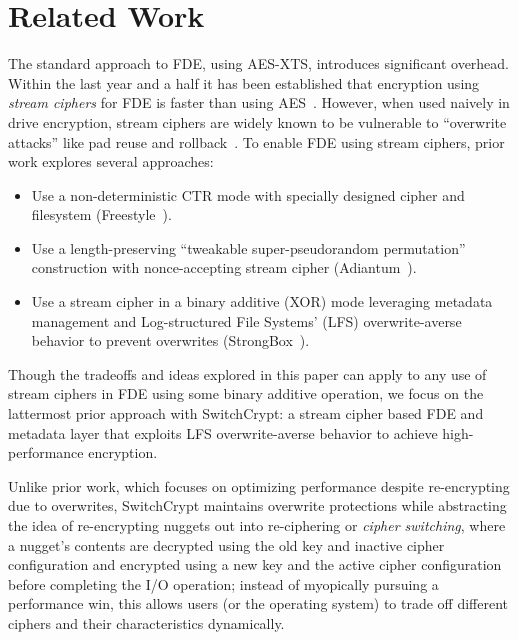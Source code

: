 \section{Related Work}\label{sec:related}

The standard approach to FDE, using AES-XTS, introduces significant overhead. 
Within the last year and a half it has been established that encryption 
using \emph{stream ciphers} for FDE is faster than using
AES~\cite{StrongBox, AnotherPaper1, AnotherPaper2}. However, when used naively
in drive encryption, stream ciphers are widely known to be vulnerable to
``overwrite attacks'' like pad reuse and rollback~\cite{KatzLindell, StrongBox}.
To enable FDE using stream ciphers, prior work explores several approaches:

\begin{itemize}
   \item Use a non-deterministic CTR mode with specially designed cipher and
   filesystem (Freestyle~\cite{Freestyle}).
   \item Use a length-preserving ``tweakable super-pseudorandom permutation''
   construction with nonce-accepting stream cipher (Adiantum~\cite{Adiantum}).
   \item Use a stream cipher in a binary additive (XOR) mode leveraging metadata
   management and Log-structured File Systems' (LFS) overwrite-averse behavior
   to prevent overwrites (StrongBox~\cite{StrongBox}).
\end{itemize}

Though the tradeoffs and ideas explored in this paper can apply to any use of
stream ciphers in FDE using some binary additive operation, we focus on the
lattermost prior approach with SwitchCrypt: a stream cipher based FDE and
metadata layer that exploits LFS overwrite-averse behavior to achieve
high-performance encryption.

Unlike prior work, which focuses on optimizing performance despite re-encrypting
due to overwrites, SwitchCrypt maintains overwrite protections while abstracting
the idea of re-encrypting nuggets out into re-ciphering or \emph{cipher
switching}, where a nugget's contents are decrypted using the old key and
inactive cipher configuration and encrypted using a new key and the active
cipher configuration before completing the I/O operation; instead of myopically
pursuing a performance win, this allows users (or the operating system) to trade
off different ciphers and their characteristics dynamically.


 

